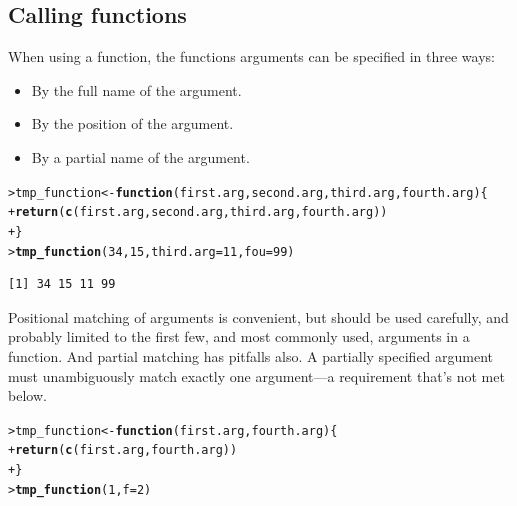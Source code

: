 \documentclass[12pt,oneside]{book}\usepackage[]{graphicx}\usepackage[]{color}
\makeatletter
\newcommand{\hlnum}[1]{\textcolor[rgb]{0.686,0.059,0.569}{#1}}%
\newcommand{\hlstd}[1]{\textcolor[rgb]{0.345,0.345,0.345}{#1}}%
\newcommand{\hlkwa}[1]{\textcolor[rgb]{0.161,0.373,0.58}{\textbf{#1}}}%
\newcommand{\hlkwb}[1]{\textcolor[rgb]{0.69,0.353,0.396}{#1}}%
\newcommand{\hlkwc}[1]{\textcolor[rgb]{0.333,0.667,0.333}{#1}}%
\newcommand{\hlkwd}[1]{\textcolor[rgb]{0.737,0.353,0.396}{\textbf{#1}}}%
\newenvironment{kframe}{%
 \def\at@end@of@kframe{}%
 \ifinner\ifhmode%
  \def\at@end@of@kframe{\end{minipage}}%
  \begin{minipage}{\columnwidth}%
 \fi\fi%
 \def\FrameCommand##1{\hskip\@totalleftmargin \hskip-\fboxsep
 \colorbox{shadecolor}{##1}\hskip-\fboxsep
     \hskip-\linewidth \hskip-\@totalleftmargin \hskip\columnwidth}%
 \MakeFramed {\advance\hsize-\width
   \@totalleftmargin\z@ \linewidth\hsize
   \@setminipage}}%
 {\par\unskip\endMakeFramed%
 \at@end@of@kframe}
\newenvironment{knitrout}{}{} %
\makeatother
\begin{document}
\subsection{Calling functions}
When using a function, the functions arguments can be specified in three ways:
\begin{itemize}
\item By the full name of the argument.
\item By the position of the argument.
\item By a partial name of the argument. 
\end{itemize}
\begin{knitrout}
\color{fgcolor}\begin{kframe}
\begin{alltt}
\hlstd{> }\hlstd{tmp_function} \hlkwb{<-} \hlkwa{function}\hlstd{(}\hlkwc{first.arg}\hlstd{,} \hlkwc{second.arg}\hlstd{,} \hlkwc{third.arg}\hlstd{,} \hlkwc{fourth.arg}\hlstd{) \{}
\hlstd{+ }    \hlkwd{return}\hlstd{(}\hlkwd{c}\hlstd{(first.arg, second.arg, third.arg, fourth.arg))}
\hlstd{+ }\hlstd{\}}
\hlstd{> }\hlkwd{tmp_function}\hlstd{(}\hlnum{34}\hlstd{,} \hlnum{15}\hlstd{,} \hlkwc{third.arg} \hlstd{=} \hlnum{11}\hlstd{,} \hlkwc{fou} \hlstd{=} \hlnum{99}\hlstd{)}
\end{alltt}
\begin{verbatim}
[1] 34 15 11 99
\end{verbatim}
\end{kframe}
\end{knitrout}
Positional matching of arguments is convenient, but should be used carefully, and probably limited to the first few, and most commonly used, arguments in a function. And partial matching has pitfalls also. A partially specified argument must unambiguously match exactly one argument---a requirement that's not met below.
\begin{knitrout}
\color{fgcolor}\begin{kframe}
\begin{alltt}
\hlstd{> }\hlstd{tmp_function} \hlkwb{<-} \hlkwa{function}\hlstd{(}\hlkwc{first.arg}\hlstd{,} \hlkwc{fourth.arg}\hlstd{) \{}
\hlstd{+ }    \hlkwd{return}\hlstd{(}\hlkwd{c}\hlstd{(first.arg, fourth.arg))}
\hlstd{+ }\hlstd{\}}
\hlstd{> }\hlkwd{tmp_function}\hlstd{(}\hlnum{1}\hlstd{,} \hlkwc{f} \hlstd{=} \hlnum{2}\hlstd{)}
\end{alltt}


{\ttfamily\noindent\bfseries\color{errorcolor}{Error in tmp\_function(1, f = 2): argument 2 matches multiple formal arguments}}\end{kframe}
\end{knitrout}
\end{document}
